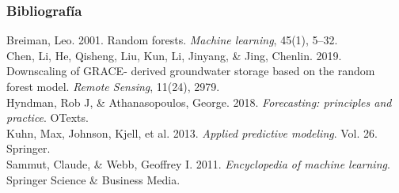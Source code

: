 \documentclass{beamer}
\begin{document}
  \begin{frame}
    \frametitle{Bibliografía}
    \small
    \begin{outline}
    \1 Breiman, Leo. 2001. Random forests. \textit{Machine learning}, 45(1), 5–32.\\
    \1 Chen, Li, He, Qisheng, Liu, Kun, Li, Jinyang, \& Jing, Chenlin. 2019. Downscaling of GRACE-
    derived groundwater storage based on the random forest model. \textit{Remote Sensing}, 11(24),
    2979.\\
    \1 Hyndman, Rob J, \& Athanasopoulos, George. 2018. \textit{Forecasting: principles and practice}.
    OTexts.\\
    \1 Kuhn, Max, Johnson, Kjell, et al. 2013. \textit{Applied predictive modeling}. Vol. 26. Springer.\\
    \1 Sammut, Claude, \& Webb, Geoffrey I. 2011. \textit{Encyclopedia of machine learning}. Springer
    Science \& Business Media.\\
    \end{outline}
    
  \end{frame}

  \section{}

  \frame{\titlepage}
\end{document}
